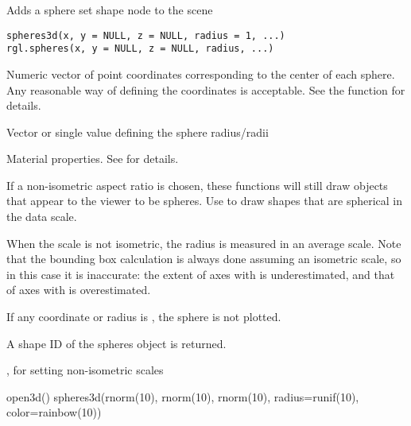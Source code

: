 \begin{Description}\relax
Adds a sphere set shape node to the scene
\end{Description}
\begin{Usage}
\begin{verbatim}
spheres3d(x, y = NULL, z = NULL, radius = 1, ...)
rgl.spheres(x, y = NULL, z = NULL, radius, ...)
\end{verbatim}
\end{Usage}
\begin{Arguments}
\begin{ldescription}
\item[\code{x, y, z}] Numeric vector of point coordinates corresponding to
the center of each sphere.  Any reasonable way of defining the
coordinates is acceptable.  See the function 
for details.
\item[\code{radius}] Vector or single value defining the sphere radius/radii
\item[\code{ ... }] Material properties. See  for details.
\end{ldescription}
\end{Arguments}
\begin{Details}\relax
If a non-isometric aspect ratio is chosen, these functions will still draw
objects that appear to the viewer to be spheres.  Use  
to draw shapes that are spherical in the data scale.

When the scale is not isometric, the radius is measured in an average scale.
Note that the bounding box calculation is always done assuming an 
isometric scale, so in this case it is inaccurate:  the extent of axes 
with  is underestimated, and that of axes with 
 is overestimated.

If any coordinate or radius is , the sphere is not plotted.
\end{Details}
\begin{Value}
A shape ID of the spheres object is returned.
\end{Value}
\begin{SeeAlso}\relax
{},  for setting non-isometric scales
\end{SeeAlso}
\begin{Examples}
\begin{ExampleCode}
open3d()
spheres3d(rnorm(10), rnorm(10), rnorm(10), radius=runif(10), color=rainbow(10))
\end{ExampleCode}
\end{Examples}


